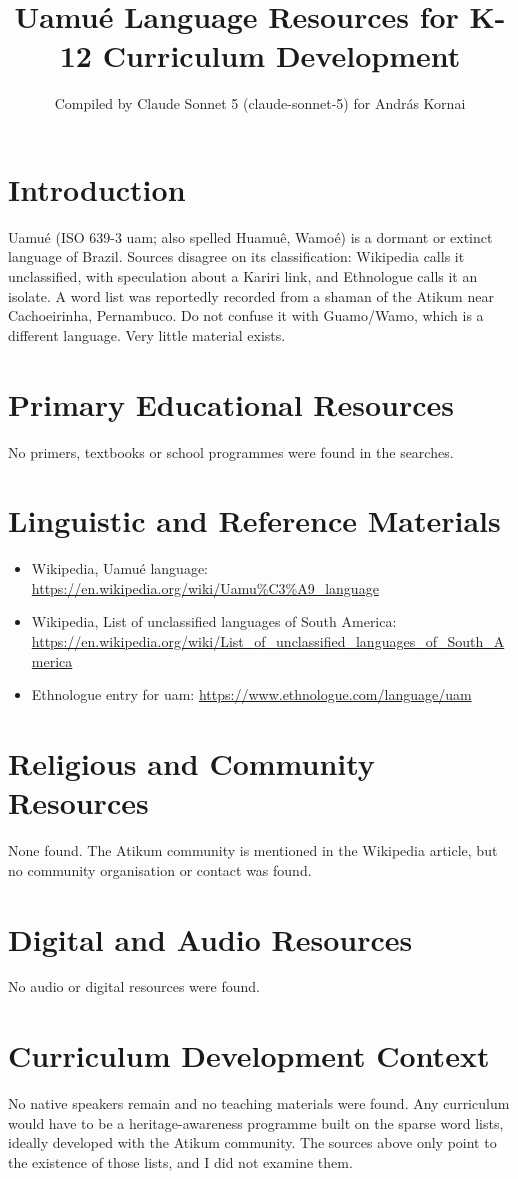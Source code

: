 \documentclass[12pt]{article}
\title{Uamu\'e Language Resources for K-12 Curriculum Development}
\author{Compiled by Claude Sonnet 5 (claude-sonnet-5) for Andr\'as Kornai}
\date{}
\begin{document}
\maketitle
\section{Introduction}
Uamu\'e (ISO 639-3 uam; also spelled Huamu\^e, Wamo\'e) is a dormant or extinct language of Brazil. Sources disagree on its classification: Wikipedia calls it unclassified, with speculation about a Kariri link, and Ethnologue calls it an isolate. A word list was reportedly recorded from a shaman of the Atikum near Cachoeirinha, Pernambuco. Do not confuse it with Guamo/Wamo, which is a different language. Very little material exists.
\section{Primary Educational Resources}
No primers, textbooks or school programmes were found in the searches.
\section{Linguistic and Reference Materials}
\begin{itemize}
\item Wikipedia, Uamu\'e language: \url{https://en.wikipedia.org/wiki/Uamu%C3%A9_language}
\item Wikipedia, List of unclassified languages of South America: \url{https://en.wikipedia.org/wiki/List_of_unclassified_languages_of_South_America}
\item Ethnologue entry for uam: \url{https://www.ethnologue.com/language/uam}
\end{itemize}
\section{Religious and Community Resources}
None found. The Atikum community is mentioned in the Wikipedia article, but no community organisation or contact was found.
\section{Digital and Audio Resources}
No audio or digital resources were found.
\section{Curriculum Development Context}
No native speakers remain and no teaching materials were found. Any curriculum would have to be a heritage-awareness programme built on the sparse word lists, ideally developed with the Atikum community. The sources above only point to the existence of those lists, and I did not examine them.
\end{document}
